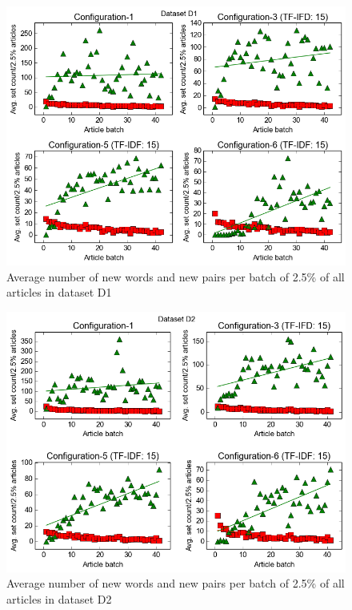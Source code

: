 \begin{figure}[h]
  \centering
  \includegraphics[scale=0.70]{images/D1-plot.png}
  \caption{Average number of new words and new pairs per batch of 2.5\% of all articles in dataset D1}
  \label{fig:setPlot1}
\end{figure}

\begin{figure}[h]
  \centering
  \includegraphics[scale=0.70]{images/D2-plot.png}
  \caption{Average number of new words and new pairs per batch of 2.5\% of all articles in dataset D2}
  \label{fig:setPlot2}
\end{figure}

